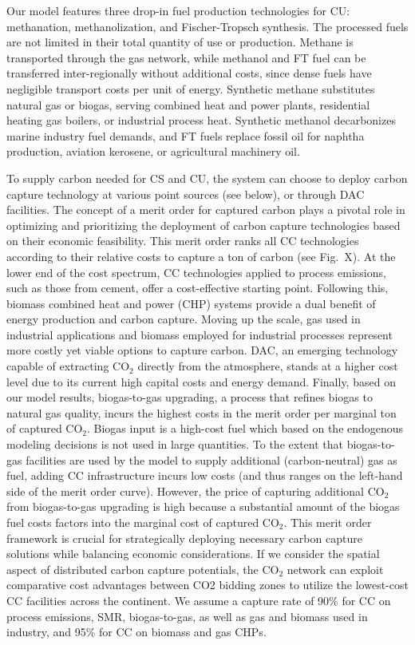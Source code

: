 \documentclass[twocolumn]{article}
\newcommand{\COtwo}{CO$_2$}
\begin{document}
Our model features three drop-in fuel production technologies for CU: methanation, methanolization, and Fischer-Tropsch synthesis. The processed fuels are not limited in their total quantity of use or production. Methane is transported through the gas network, while methanol and FT fuel can be transferred inter-regionally without additional costs, since dense fuels have negligible transport costs per unit of energy. Synthetic methane substitutes natural gas or biogas, serving combined heat and power plants, residential heating gas boilers, or industrial process heat. Synthetic methanol decarbonizes marine industry fuel demands, and FT fuels replace fossil oil for naphtha production, aviation kerosene, or agricultural machinery oil.

To supply carbon needed for CS and CU, the system can choose to deploy carbon capture technology at various point sources (see below), or through DAC facilities. The concept of a merit order for captured carbon plays a pivotal role in optimizing and prioritizing the deployment of carbon capture technologies based on their economic feasibility. This merit order ranks all CC technologies according to their relative costs to capture a ton of carbon (see Fig.~X). At the lower end of the cost spectrum, CC technologies applied to process emissions, such as those from cement, offer a cost-effective starting point. Following this, biomass combined heat and power (CHP) systems provide a dual benefit of energy production and carbon capture. Moving up the scale, gas used in industrial applications and biomass employed for industrial processes represent more costly yet viable options to capture carbon. DAC, an emerging technology capable of extracting \COtwo{} directly from the atmosphere, stands at a higher cost level due to its current high capital costs and energy demand. Finally, based on our model results, biogas-to-gas upgrading, a process that refines biogas to natural gas quality, incurs the highest costs in the merit order per marginal ton of captured \COtwo{}. Biogas input is a high-cost fuel which based on the endogenous modeling decisions is not used in large quantities. To the extent that biogas-to-gas facilities are used by the model to supply additional (carbon-neutral) gas as fuel, adding CC infrastructure incurs low costs (and thus ranges on the left-hand side of the merit order curve). However, the price of capturing additional \COtwo{} from biogas-to-gas upgrading is high because a substantial amount of the biogas fuel costs factors into the marginal cost of captured \COtwo{}. This merit order framework is crucial for strategically deploying necessary carbon capture solutions while balancing economic considerations. If we consider the spatial aspect of distributed carbon capture potentials, the \COtwo{} network can exploit comparative cost advantages between CO2 bidding zones to utilize the lowest-cost CC facilities across the continent. We assume a capture rate of 90\% for CC on process emissions, SMR, biogas-to-gas, as well as gas and biomass used in industry, and 95\% for CC on biomass and gas CHPs.
\end{document}
